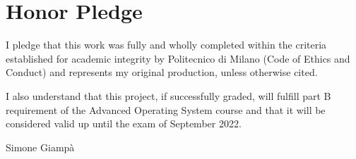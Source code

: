 \documentclass[10pt]{article}
\begin{document}
    \section{Honor Pledge}

    I pledge that this work was fully and wholly completed within the criteria established for academic integrity by Politecnico di Milano
    (Code of Ethics and Conduct) and represents my original production, unless otherwise cited.

    I also understand that this project, if successfully graded, will fulfill part B requirement of the Advanced Operating System course
    and that it will be considered valid up until the exam of September 2022.

    \begin{flushright}
        Simone Giampà
    \end{flushright}
\end{document}
